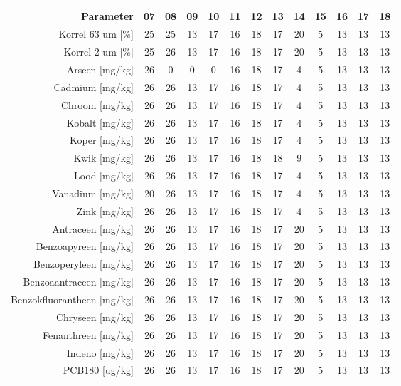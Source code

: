 \begin{tabular}{ r |c | c | c | c | c |c | c | c | c | c | c | c } 
\rowcolor[HTML]{EFEFEF}  
 Parameter & 07 & 08 & 09 & 10 & 11 & 12 & 13 & 14 & 15 & 16 & 17 & 18 \\    \hline     
Korrel 63 um [\%] &25 & 25 & 13 & 17 & 16 & 18 & 17 & 20 & 5 & 13 & 13 & 13 \\
Korrel 2 um [\%] &25 & 26 & 13 & 17 & 16 & 18 & 17 & 20 & 5 & 13 & 13 & 13 \\
Arseen [mg/kg] &26 & 0 & 0 & 0 & 16 & 18 & 17 & 4 & 5 & 13 & 13 & 13 \\
Cadmium [mg/kg] &26 & 26 & 13 & 17 & 16 & 18 & 17 & 4 & 5 & 13 & 13 & 13 \\
Chroom [mg/kg] &26 & 26 & 13 & 17 & 16 & 18 & 17 & 4 & 5 & 13 & 13 & 13 \\
Kobalt [mg/kg] &26 & 26 & 13 & 17 & 16 & 18 & 17 & 4 & 5 & 13 & 13 & 13 \\
Koper [mg/kg] &26 & 26 & 13 & 17 & 16 & 18 & 17 & 4 & 5 & 13 & 13 & 13 \\
Kwik [mg/kg] &26 & 26 & 13 & 17 & 16 & 18 & 18 & 9 & 5 & 13 & 13 & 13 \\
Lood [mg/kg] &26 & 26 & 13 & 17 & 16 & 18 & 17 & 4 & 5 & 13 & 13 & 13 \\
Vanadium [mg/kg] &20 & 26 & 13 & 17 & 16 & 18 & 17 & 4 & 5 & 13 & 13 & 13 \\
Zink [mg/kg] &26 & 26 & 13 & 17 & 16 & 18 & 17 & 4 & 5 & 13 & 13 & 13 \\
Antraceen [mg/kg] &26 & 26 & 13 & 17 & 16 & 18 & 17 & 20 & 5 & 13 & 13 & 13 \\
Benzoapyreen [mg/kg] &26 & 26 & 13 & 17 & 16 & 18 & 17 & 20 & 5 & 13 & 13 & 13 \\
Benzoperyleen [mg/kg] &26 & 26 & 13 & 17 & 16 & 18 & 17 & 20 & 5 & 13 & 13 & 13 \\
Benzoaantraceen [mg/kg] &26 & 26 & 13 & 17 & 16 & 18 & 17 & 20 & 5 & 13 & 13 & 13 \\
Benzokfluorantheen [mg/kg] &26 & 26 & 13 & 17 & 16 & 18 & 17 & 20 & 5 & 13 & 13 & 13 \\
Chryseen [mg/kg] &26 & 26 & 13 & 17 & 16 & 18 & 17 & 20 & 5 & 13 & 13 & 13 \\
Fenanthreen [mg/kg] &26 & 26 & 13 & 17 & 16 & 18 & 17 & 20 & 5 & 13 & 13 & 13 \\
Indeno [mg/kg] &26 & 26 & 13 & 17 & 16 & 18 & 17 & 20 & 5 & 13 & 13 & 13 \\
PCB180 [ug/kg] &26 & 26 & 13 & 17 & 16 & 18 & 17 & 20 & 5 & 13 & 13 & 13 \\

\end{tabular}
